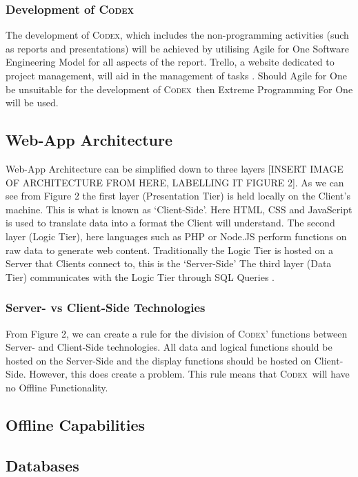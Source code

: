 \documentclass[review]{cmpreport}
\newcommand{\Codex}{\textsc{Codex}}
\begin{document}
	\subsubsection{Development of \Codex}
	The development of \Codex, which includes the non-programming activities (such as reports and presentations) will be achieved by utilising Agile for One Software Engineering Model for all aspects of the report. Trello, a website dedicated to project management, will aid in the management of tasks \citep{Trello}. Should Agile for One be unsuitable for the development of \Codex \ then Extreme Programming For One will be used. 
	
	\subsection{Web-App Architecture} \label{Web-Arch}
	Web-App Architecture can be simplified down to three layers [INSERT IMAGE OF ARCHITECTURE FROM \citep{SecurityWebApps} HERE, LABELLING IT FIGURE 2]. As we can see from Figure 2 the first layer (Presentation Tier) is held locally on the Client's machine. This is what is known as `Client-Side'. Here HTML, CSS and JavaScript is used to translate data into a format the Client will understand. The second layer (Logic Tier), here languages such as PHP or Node.JS perform functions on raw data to generate web content. Traditionally the Logic Tier is hosted on a Server that Clients connect to, this is the `Server-Side' The third layer (Data Tier) communicates with the Logic Tier through SQL Queries \citep{SecurityWebApps}.
	
	\subsubsection{Server- vs Client-Side Technologies}
	From Figure 2, we can create a rule for the division of \Codex' functions between Server- and Client-Side technologies. All data and logical functions should be hosted on the Server-Side and the display functions should be hosted on Client-Side. However, this does create a problem. This rule means that \Codex \ will have no Offline Functionality. 
	
	\subsection{Offline Capabilities} \label{Offline}

	\subsection{Databases} \label{Database}
\end{document}
